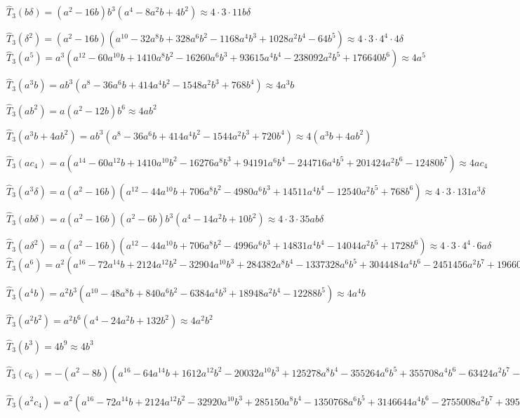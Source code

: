 \documentclass{rs}
\theoremstyle{definition}
\theoremstyle{remark}
\renewcommand{\d}{\delta}
\newcommand{\Ht}{\widehat{T}}
\renewcommand{\=}{\approx}
\renewcommand{\-}{\sim}
\numberwithin{equation}{section}
\numberwithin{thm}{section}
\begin{document}
\begin{itemize}
 $\Ht_3(b \d) = (a^2 - 16 b) b^3 (a^4 - 8 a^2 b + 4 b^2) \= 4 \cdot 3 \cdot 11 b \d$ 

 $\Ht_3(\d^2) = (a^2 - 16 b) (a^{10} - 32 a^8 b + 328 a^6 b^2 - 1168 a^4 b^3 + 
   1028 a^2 b^4 - 64 b^5) \= 4 \cdot 3 \cdot 4^4 \cdot 4 \d$ \\

 $\Ht_3(a^5) = a^3 (a^{12} - 60 a^{10} b + 1410 a^8 b^2 - 16260 a^6 b^3 + 
   93615 a^4 b^4 - 238092 a^2 b^5 + 176640 b^6) \= 4 a^5$ 

 $\Ht_3(a^3 b) = a b^3 (a^8 - 36 a^6 b + 414 a^4 b^2 - 1548 a^2 b^3 + 768 b^4) \= 4 a^3 b$ 

 $\Ht_3(a b^2) = a (a^2 - 12 b) b^6 \= 4 a b^2$ 

 $\Ht_3(a^3 b + 4 a b^2) = a b^3 (a^8 - 36 a^6 b + 414 a^4 b^2 - 1544 a^2 b^3 + 720 b^4) \= 4 (a^3 b + 4 a b^2)$ 

 $\Ht_3(a c_4) = a (a^{14} - 60 a^{12} b + 1410 a^{10} b^2 - 16276 a^8 b^3 + 94191 a^6 b^4 - 
   244716 a^4 b^5 + 201424 a^2 b^6 - 12480 b^7) \= 4 a c_4$ 

 $\Ht_3(a^3 \d) = a (a^2 - 16 b) (a^{12} - 44 a^{10} b + 706 a^8 b^2 - 4980 a^6 b^3 + 
   14511 a^4 b^4 - 12540 a^2 b^5 + 768 b^6) \= 4 \cdot 3 \cdot 131 a^3 \d$ 

 $\Ht_3(a b \d) = a (a^2 - 16 b) (a^2 - 6 b) b^3 (a^4 - 14 a^2 b + 10 b^2) \= 4 \cdot 3 \cdot 35 a b \d$ 

 $\Ht_3(a \d^2) = a (a^2 - 16 b) (a^{12} - 44 a^{10} b + 706 a^8 b^2 - 4996 a^6 b^3 + 
   14831 a^4 b^4 - 14044 a^2 b^5 + 1728 b^6) \= 4 \cdot 3 \cdot 4^4 \cdot 6 a \d$ \\

 $\Ht_3(a^6) = a^2 (a^{16} - 72 a^{14} b + 2124 a^{12} b^2 - 32904 a^{10} b^3 + 
   284382 a^8 b^4 - 1337328 a^6 b^5 + 3044484 a^4 b^6 - 
   2451456 a^2 b^7 + 196608 b^8) \= 4 a^6$ 

 $\Ht_3(a^4 b) = a^2 b^3 (a^{10} - 48 a^8 b + 840 a^6 b^2 - 6384 a^4 b^3 + 
   18948 a^2 b^4 - 12288 b^5) \= 4 a^4 b$ 

 $\Ht_3(a^2 b^2) = a^2 b^6 (a^4 - 24 a^2 b + 132 b^2) \= 4 a^2 b^2$ 

 $\Ht_3(b^3) = 4 b^9 \= 4 b^3$ 

 $\Ht_3(c_6) = -(a^2 - 8 b) (a^{16} - 64 a^{14} b + 1612 a^{12} b^2 - 20032 a^{10} b^3 + 125278 a^8 b^4 - 355264 a^6 b^5 + 355708 a^4 b^6 - 63424 a^2 b^7 - 32 b^8) 
 \= 4 c_6$ 

 $\Ht_3(a^2 c_4) = a^2 (a^{16} - 72 a^{14} b + 2124 a^{12} b^2 - 32920 a^{10} b^3 + 
   285150 a^8 b^4 - 1350768 a^6 b^5 + 3146644 a^4 b^6 - 
   2755008 a^2 b^7 + 395328 b^8) \= 4 a^2 c_4$ 


\end{itemize}
\end{document}
